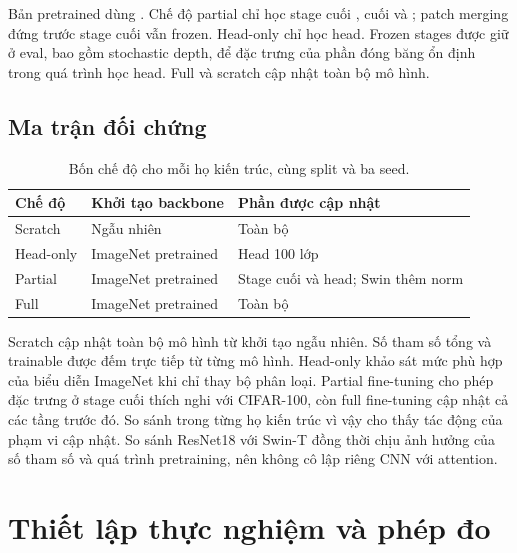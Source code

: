 \documentclass[12pt,a4paper]{report}
\begin{document}
Bản pretrained dùng . Chế độ partial chỉ
học stage cuối ,  cuối và ; patch
merging đứng trước stage cuối vẫn frozen. Head-only chỉ học head. Frozen
stages được giữ ở eval, bao gồm stochastic depth, để đặc trưng của phần
đóng băng ổn định trong quá trình học head. Full và scratch cập nhật toàn bộ mô hình.

\section{Ma trận đối chứng}
\begin{table}[htbp]\centering
\begin{tabular}{lll}
\toprule
Chế độ & Khởi tạo backbone & Phần được cập nhật\\\midrule
Scratch & Ngẫu nhiên & Toàn bộ\\
Head-only & ImageNet pretrained & Head 100 lớp\\
Partial & ImageNet pretrained & Stage cuối và head; Swin thêm norm\\
Full & ImageNet pretrained & Toàn bộ\\\bottomrule
\end{tabular}
\caption{Bốn chế độ cho mỗi họ kiến trúc, cùng split và ba seed.}
\end{table}
Scratch cập nhật toàn bộ mô hình từ khởi tạo ngẫu nhiên. Số tham số tổng và
trainable được đếm trực tiếp từ từng mô hình.
Head-only khảo sát mức phù hợp của biểu diễn ImageNet khi chỉ thay bộ phân loại. Partial fine-tuning cho phép đặc trưng ở stage cuối thích nghi với CIFAR-100, còn full fine-tuning cập nhật cả các tầng trước đó. So sánh trong từng họ kiến trúc vì vậy cho thấy tác động của phạm vi cập nhật. So sánh ResNet18 với Swin-T đồng thời chịu ảnh hưởng của số tham số và quá trình pretraining, nên không cô lập riêng CNN với attention.

\chapter{Thiết lập thực nghiệm và phép đo}
\end{document}
